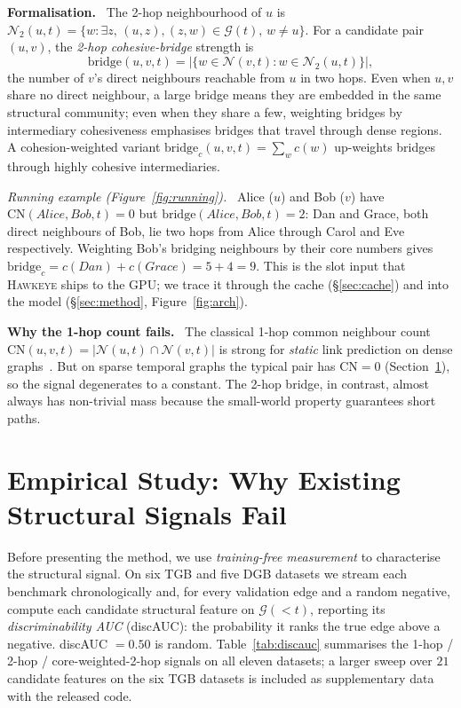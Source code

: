 \documentclass[sigconf,nonacm,review]{acmart}
\newcommand{\method}{\textsc{Hawkeye}\xspace}
\newcommand{\Ncal}{\mathcal{N}}
\newcommand{\Gcal}{\mathcal{G}}
\begin{document}
\medskip
\noindent\textbf{Formalisation.} \ The 2-hop neighbourhood of $u$ is
$\Ncal_2(u,t)=\{w:\exists z,\,(u,z),(z,w)\in\Gcal(t),\,w\neq u\}$. For a
candidate pair $(u,v)$, the \emph{2-hop cohesive-bridge} strength is
\begin{equation}
\mathrm{bridge}(u,v,t)=\bigl|\{w\in\Ncal(v,t):w\in\Ncal_2(u,t)\}\bigr|,
\end{equation}
the number of $v$'s direct neighbours reachable from $u$ in two hops.
Even when $u,v$ share no direct neighbour, a large bridge means they are
embedded in the same structural community; even when they share a few,
weighting bridges by intermediary cohesiveness emphasises bridges that
travel through dense regions. A cohesion-weighted variant
$\mathrm{bridge}_c(u,v,t)=\sum_{w}c(w)$ up-weights bridges through highly
cohesive intermediaries.

\medskip
\noindent\emph{Running example (Figure~\ref{fig:running}).} \ Alice ($u$) and
Bob ($v$) have $\mathrm{CN}(\textit{Alice},\textit{Bob},t)=0$ but
$\mathrm{bridge}(\textit{Alice},\textit{Bob},t)=2$: Dan and Grace, both
direct neighbours of Bob, lie two hops from Alice through Carol and Eve
respectively. Weighting Bob's bridging neighbours by their core numbers
gives $\mathrm{bridge}_c=c(\textit{Dan})+c(\textit{Grace})=5+4=9$. This
is the slot input that \method ships to the GPU; we trace it through the
cache (\S\ref{sec:cache}) and into the model (\S\ref{sec:method},
Figure~\ref{fig:arch}).

\medskip
\noindent\textbf{Why the 1-hop count fails.} \ The classical 1-hop common
neighbour count $\mathrm{CN}(u,v,t)=|\Ncal(u,t)\cap\Ncal(v,t)|$ is strong
for \emph{static} link prediction on dense
graphs~\cite{liben2007linkpred,lu2011linkpred,kumar2020linkpred}. But on
sparse temporal graphs the typical pair has $\mathrm{CN}=0$
(Section~\ref{sec:study}), so the signal degenerates to a constant. The
2-hop bridge, in contrast, almost always has non-trivial mass because the
small-world property guarantees short paths.

\section{Empirical Study: Why Existing Structural Signals Fail}
\label{sec:study}

Before presenting the method, we use \emph{training-free measurement} to
characterise the structural signal. On six TGB and five DGB datasets we
stream each benchmark chronologically and, for every validation edge and
a random negative, compute each candidate structural feature on
$\Gcal(<t)$, reporting its \emph{discriminability AUC} (discAUC): the
probability it ranks the true edge above a negative. discAUC $=0.50$ is random. Table~\ref{tab:discauc} summarises the
1-hop / 2-hop / core-weighted-2-hop signals on all eleven datasets; a
larger sweep over $21$ candidate features on the six TGB datasets is
included as supplementary data with the released code.
\end{document}
